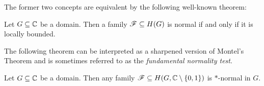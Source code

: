 The former two concepts are equivalent by the following well-known theorem:

\begin{theorem}[Montel] \label{thm:montel}
    Let $G \subseteq \mathbb{C}$ be a domain. Then a family $\mathscr{F} \subseteq H(G)$ is normal if and only if it is locally bounded.
\end{theorem}

The following theorem can be interpreted as a sharpened version of Montel's Theorem and is sometimes referred to as the \emph{fundamental normality test}.

\begin{theorem} \label{lem:montel-sharpened}
    Let $G \subseteq \mathbb{C}$ be a domain. Then any family $\mathscr{F} \subseteq H(G, \mathbb{C} \setminus \{ 0, 1 \})$ is $\ast$-normal in $G$.
\end{theorem}

